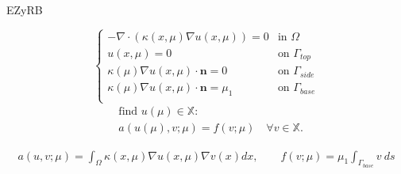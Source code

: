 \begin{frame}{EZyRB}
	\Large{}
	\normalsize
	
	\begin{minipage}[c]{5.5cm} 
		\begin{equation*}
		\begin{cases}
		- \nabla \cdot (\kappa(x,\mu)\nabla u(x,\mu)) = 0 	& \text{in } \Omega 		\\
		u(x,\mu) = 0 										& \text{on } \Gamma_{top} 	\\
		\kappa(\mu)\nabla u(x,\mu)\cdot \mathbf{n} = 0 		& \text{on } \Gamma_{side} 	\\
		\kappa(\mu)\nabla u(x,\mu)\cdot \mathbf{n} = \mu_1 	& \text{on } \Gamma_{base} 	\\
		\end{cases}
		\end{equation*}
		\begin{align*}
			&\text{find }u(\mu) \in \mathbb{X}:\\
			&a(u(\mu),v;\mu) = f(v;\mu) \quad \forall v \in \mathbb{X}.
		\end{align*}
	\end{minipage}
	\begin{minipage}[c]{5cm} 
		\scalebox{0.75}{
			
		}
	\end{minipage}
	\begin{align*}
		a(u,v;\mu) = \int_{\Omega} \kappa(x,\mu)\nabla u(x,\mu) \nabla v(x) dx, 
		\qquad
		f(v;\mu) = \mu_1 \int_{\Gamma_{base}} v ~ ds
 	\end{align*}
\end{frame}

